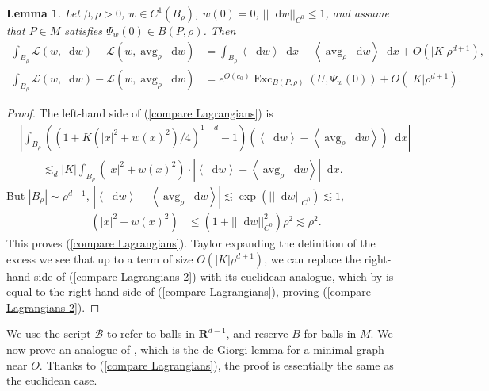 \documentclass[reqno,10pt]{amsart}
\newcommand{\RR}{\mathbf{R}}
\DeclareMathOperator{\avg}{avg}
\DeclareMathOperator{\Exc}{Exc}
\newcommand*\dif{\mathop{}\!\mathrm{d}}
\newcommand{\Lagrange}{\mathscr L}
\def\Japan#1{\left \langle #1 \right \rangle}
\newtheorem{lemma}[theorem]{Lemma}
\theoremstyle{definition}
\numberwithin{equation}{section}
\begin{document}
\begin{lemma}
Let $\beta, \rho > 0$, $w \in C^1(B_\rho)$, $w(0) = 0$, $||\dif w||_{C^0} \leq 1$, and assume that $P \in M$ satisfies $\Psi_w(0) \in B(P, \rho)$. Then
\begin{align}
\int_{B_\rho} \Lagrange(w, \dif w) - \Lagrange(w, \avg_\rho \dif w) &= \int_{B_\rho} \Japan{\dif w} \dif x - \Japan{\avg_\rho \dif w} \dif x + O(|K| \rho^{d + 1}) \label{compare Lagrangians}, \\
\int_{B_\rho} \Lagrange(w, \dif w) - \Lagrange(w, \avg_\rho \dif w) &= e^{O(c_0)} \Exc_{B(P, \rho)} (U, \Psi_w(0)) + O(|K| \rho^{d + 1}). \label{compare Lagrangians 2}
\end{align}
\end{lemma}
\begin{proof}
The left-hand side of (\ref{compare Lagrangians}) is
\begin{align*}
&\left|\int_{B_\rho} ((1 + K(|x|^2 + w(x)^2)/4)^{1 - d} - 1)(\Japan{\dif w} - \Japan{\avg_\rho \dif w}) \dif x\right| \\
&\qquad \lesssim_d |K| \int_{B_\rho} (|x|^2 + w(x)^2) \cdot \left|\Japan{\dif w} - \Japan{\avg_\rho \dif w}\right| \dif x.
\end{align*}
But $|B_\rho| \sim \rho^{d - 1}$, $|\Japan{\dif w} - \Japan{\avg_\rho \dif w}| \lesssim \exp(||\dif w||_{C^0}) \lesssim 1$,
\begin{align*}
(|x|^2 + w(x)^2) &\leq (1 + ||\dif w||_{C^0}^2) \rho^2 \lesssim \rho^2.
\end{align*}
This proves (\ref{compare Lagrangians}). Taylor expanding the definition of the excess we see that up to a term of size $O(|K| \rho^{d + 1})$, we can replace the right-hand side of (\ref{compare Lagrangians 2}) with its euclidean analogue, which by \cite[pg83]{Giusti77} is equal to the right-hand side of (\ref{compare Lagrangians}), proving (\ref{compare Lagrangians 2}).
\end{proof}

We use the script $\mathscr B$ to refer to balls in $\RR^{d - 1}$, and reserve $B$ for balls in $M$.
We now prove an analogue of \cite[Lemma 6.3]{Giusti77}, which is the de Giorgi lemma for a minimal graph near $O$.
Thanks to (\ref{compare Lagrangians}), the proof is essentially the same as the euclidean case.
\end{document}
